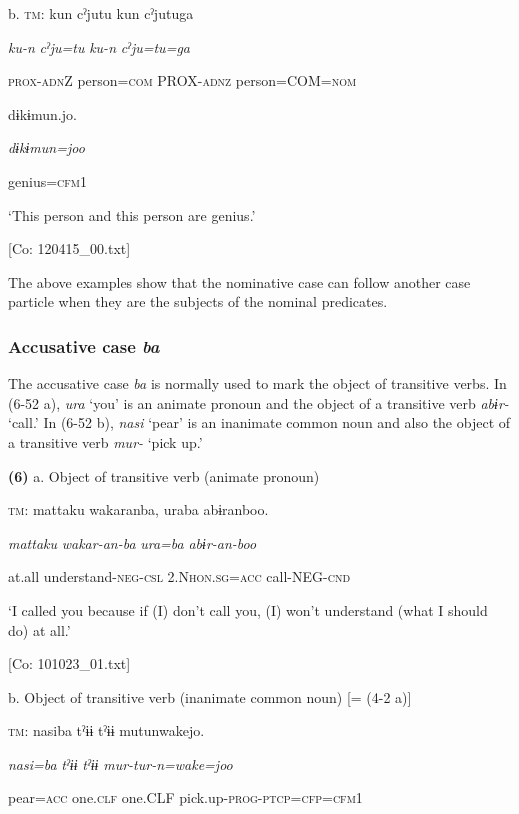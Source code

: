   b.  \textsc{tm}:  kun  cˀjutu  kun  cˀjutuga

      \textit{ku-n}  \textit{cˀju=tu}  \textit{ku-n}  \textit{cˀju=tu=ga}

      \textsc{prox}-\textsc{adn}Z  person=\textsc{com}  PROX-\textsc{adnz}  person=COM=\textsc{nom}

      dɨkɨmun.jo.

      \textit{dɨkɨmun=joo}

      genius=\textsc{cfm}1

      ‘This person and this person are genius.’

      [Co: 120415\_00.txt]

The above examples show that the nominative case can follow another case particle when they are the subjects of the nominal predicates.

\subsubsection{Accusative case \textit{ba}}

The accusative case \textit{ba} is normally used to mark the object of transitive verbs. In (6-52 a), \textit{ura} ‘you’ is an animate pronoun and the object of a transitive verb \textit{abɨr-} ‘call.’ In (6-52 b), \textit{nasi} ‘pear’ is an inanimate common noun and also the object of a transitive verb \textit{mur{}-} ‘pick up.’

\textbf{(6)}  a.  Object of transitive verb (animate pronoun)

    \textsc{tm}:  mattaku  wakaranba,  uraba  abɨranboo.

      \textit{mattaku}  \textit{wakar-an-ba}  \textit{ura=ba}  \textit{abɨr-an-boo}

      at.all  understand-\textsc{neg}-\textsc{csl}  2.N\textsc{hon}.\textsc{sg}=\textsc{acc}  call-NEG-\textsc{cnd}

      ‘I called you because if (I) don’t call you, (I) won’t understand (what I should do) at all.’

      [Co: 101023\_01.txt]

  b.  Object of transitive verb (inanimate common noun) [= (4-2 a)]

    \textsc{tm}:  nasiba  tˀɨɨ  tˀɨɨ  mutunwakejo.

      \textit{nasi=ba}  \textit{tˀɨɨ}  \textit{tˀɨɨ}  \textit{mur-tur-n=wake=joo}

      pear=\textsc{acc}  one.\textsc{clf}  one.CLF  pick.up-\textsc{prog}-\textsc{ptcp}=\textsc{cfp}=\textsc{cfm}1

